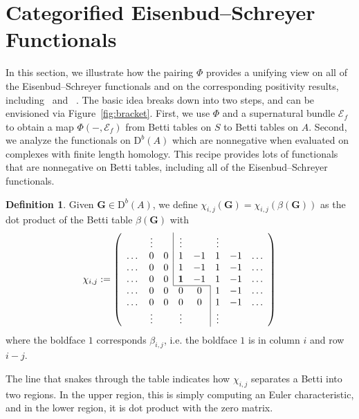 \documentclass[12pt]{amsart}
\theoremstyle{definition}
\newtheorem{defn}[lemma]{Definition}
\theoremstyle{remark}
\newcommand{\cE}{\mathcal{E}}
\newcommand{\Gbull}{\mathbf{G}}
\newcommand{\DD}{\mathrm{D}}
\begin{document}
\section{Categorified Eisenbud--Schreyer Functionals}\label{sec:functionals}
In this section, we illustrate how the pairing $\Phi$ provides a unifying view on all of the Eisenbud--Schreyer functionals and on the corresponding positivity results, including~\cite[Positivity 1]{eis-schrey-icm} and~ \cite[Positivity 2]{eis-schrey-icm}.  The basic idea breaks down into two steps, and can be envisioned via Figure~\ref{fig:bracket}.  First, we use $\Phi$ and a supernatural bundle $\cE_f$ to obtain a map $\Phi(-,\cE_f)$ from Betti tables on $S$ to Betti tables on $A$.  Second, we analyze the functionals on $\DD^b(A)$ which are nonnegative when evaluated on complexes with finite length homology.  
This recipe provides lots of functionals that are nonnegative on Betti tables, including all of the Eisenbud--Schreyer functionals.

\begin{defn}\label{defn:chi}
Given $\Gbull\in \DD^b(A)$, we define $\chi_{i,j}(\Gbull)=\chi_{i,j}(\beta(\Gbull))$ as the dot product of the Betti table $\beta(\Gbull)$ with
\[
\chi_{i,j}:=
\left(
\begin{array}{cccccccc}
 & \vdots& &\multicolumn{1}{|c}{\vdots}&& \vdots&&\\
\dots&0&0&\multicolumn{1}{|c}{1}&-1&1&-1&\dots\\
\dots&0&0&\multicolumn{1}{|c}{1}&-1&1&-1&\dots\\
\dots&0&0&\multicolumn{1}{|c}{\mathbf{1}}&-1&1&-1&\dots\\ \cline{4-5}
\dots&0&0&0&0&\multicolumn{1}{|c}{1}&-1&\dots\\
\dots&0&0&0&0&\multicolumn{1}{|c}{1}&-1&\dots\\
& \vdots&&\vdots&& \multicolumn{1}{|c}{\vdots}&&\\
\end{array}
\right)
\]
where the boldface $1$ corresponds $\beta_{i,j}$, i.e. the boldface $1$ is in column $i$ and row $i-j$. 
\end{defn}
The line that snakes through
the table indicates how $\chi_{i,j}$ separates a Betti into two regions.  In the upper region, this is simply computing an Euler characteristic, and in the lower region, it is dot product with the zero matrix.
\end{document}
